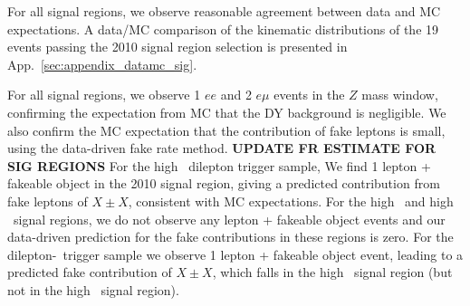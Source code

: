 For all signal regions, we observe reasonable agreement between data and MC expectations. 
A data/MC comparison of the kinematic distributions of the 19 events passing
the 2010 signal region selection is presented in App.~\ref{sec:appendix_datamc_sig}.

For all signal regions, we observe 1 $ee$ and 2 $e\mu$ events in the $Z$ mass window,
confirming the expectation from MC that the DY background is negligible. We also confirm 
the MC expectation that
the contribution of fake leptons is small, using the data-driven fake
rate method. 
{\bf UPDATE FR ESTIMATE FOR SIG REGIONS}
For the high \pt\ dilepton trigger sample, We find 1 lepton + fakeable 
object in the 2010 signal region, giving a predicted contribution from fake 
leptons of $X \pm X$, consistent with MC expectations. For the high \met\ 
and high \Ht\ signal regions, we do not observe any lepton + fakeable object 
events and our data-driven prediction for the fake contributions in these regions is zero.
For the dilepton-\Ht\ trigger sample we observe 1 lepton + fakeable object
event, leading to a predicted fake contribution of $X \pm X$, which falls
in the high \met\ signal region (but not in the high \Ht\ signal region).

